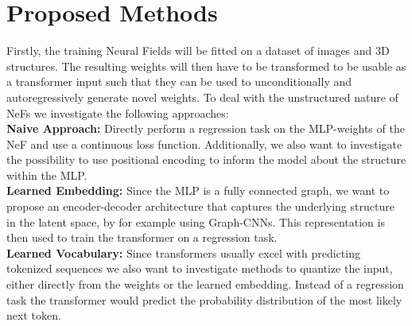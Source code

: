 \section{Proposed Methods}
\label{sec:method}
Firstly, the training Neural Fields will be fitted on a dataset of images and 3D structures. The resulting weights will then have to be transformed to be usable as a transformer input such that they can be used to unconditionally and autoregressively generate novel weights. To deal with the unstructured nature of NeFs we investigate the following approaches:\\
\noindent \textbf{Naive Approach: }
Directly perform a regression task on the MLP-weights of the NeF and use a continuous loss function.
Additionally, we also want to investigate the possibility to use positional encoding to inform the model about the structure within the MLP.
\\
\textbf{Learned Embedding: }
Since the MLP is a fully connected graph, we want to propose an encoder-decoder architecture that captures the underlying structure in the latent space, by for example using Graph-CNNs. This representation is then used to train the transformer on a regression task.
\\
\textbf{Learned Vocabulary: }
Since transformers usually excel with predicting tokenized sequences we also want to investigate methods to quantize the input, either directly from the weights or the learned embedding. Instead of a regression task the transformer would predict the probability distribution of the most likely next token.

